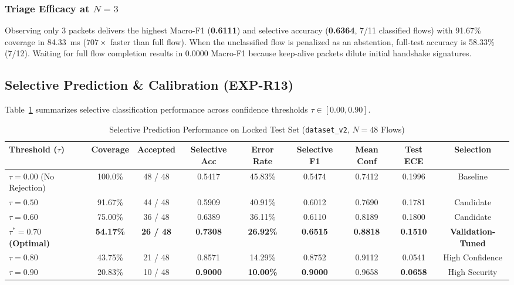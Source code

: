 \documentclass[conference]{IEEEtran}
\begin{document}
\subsubsection{Triage Efficacy at $N=3$}
Observing only 3 packets delivers the highest Macro-F1 (\textbf{0.6111}) and selective accuracy (\textbf{0.6364}, 7/11 classified flows) with 91.67\% coverage in 84.33~ms ($707\times$ faster than full flow). When the unclassified flow is penalized as an abstention, full-test accuracy is 58.33\% (7/12). Waiting for full flow completion results in 0.0000 Macro-F1 because keep-alive packets dilute initial handshake signatures.

\subsection{Selective Prediction \& Calibration (EXP-R13)}
Table~\ref{tab:selective_prediction} summarizes selective classification performance across confidence thresholds $\tau \in [0.00, 0.90]$.

\begin{table}[t]
\centering
\caption{Selective Prediction Performance on Locked Test Set (\texttt{dataset\_v2}, $N=48$ Flows)}
\label{tab:selective_prediction}
\footnotesize
\begin{tabularx}{\textwidth}{lcccccccc}
\toprule
\textbf{Threshold ($\tau$)} & \textbf{Coverage} & \textbf{Accepted} & \textbf{Selective Acc} & \textbf{Error Rate} & \textbf{Selective F1} & \textbf{Mean Conf} & \textbf{Test ECE} & \textbf{Selection} \\
\midrule
$\tau = 0.00$ (No Rejection) & 100.0\% & 48 / 48 & 0.5417 & 45.83\% & 0.5474 & 0.7412 & 0.1996 & Baseline \\
$\tau = 0.50$ & 91.67\% & 44 / 48 & 0.5909 & 40.91\% & 0.6012 & 0.7690 & 0.1781 & Candidate \\
$\tau = 0.60$ & 75.00\% & 36 / 48 & 0.6389 & 36.11\% & 0.6110 & 0.8189 & 0.1800 & Candidate \\
\textbf{$\tau^* = 0.70$ (Optimal)} & \textbf{54.17\%} & \textbf{26 / 48} & \textbf{0.7308} & \textbf{26.92\%} & \textbf{0.6515} & \textbf{0.8818} & \textbf{0.1510} & \textbf{Validation-Tuned} \\
$\tau = 0.80$ & 43.75\% & 21 / 48 & 0.8571 & 14.29\% & 0.8752 & 0.9112 & 0.0541 & High Confidence \\
$\tau = 0.90$ & 20.83\% & 10 / 48 & \textbf{0.9000} & \textbf{10.00\%} & \textbf{0.9000} & 0.9658 & \textbf{0.0658} & High Security \\
\bottomrule
\end{tabularx}
\end{table}
\end{document}
